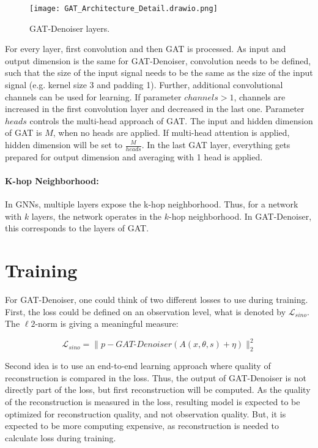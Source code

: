 \begin{figure}[H]
  \centering
  \texttt{[image: GAT\_Architecture\_Detail.drawio.png]}
  \caption{GAT-Denoiser layers.}
  \label{fig:architecture-detailed}
\end{figure}


For every layer, first convolution and then GAT is processed. 
As input and output dimension is the same for GAT-Denoiser,
convolution needs to be defined, such that the size of the input signal needs to be the same as the size of the input signal
(e.g. kernel size 3 and padding 1).
Further, additional convolutional channels can be used for learning.
If parameter $channels > 1$, channels are increased in the first convolution layer 
and decreased in the last one.
Parameter $heads$ controls the multi-head approach of GAT. The input and hidden dimension
of GAT is $M$, when no heads are applied.
If multi-head attention is applied, hidden dimension will be set to $\frac{M}{heads}$.
In the last GAT layer, everything gets prepared for output dimension and 
averaging with 1 head is applied.

\paragraph{K-hop Neighborhood:}
In GNNs, multiple layers expose the k-hop neighborhood. Thus, for a network with $k$ layers,
the network operates in the $k$-hop neighborhood. In GAT-Denoiser, this corresponds
to the layers of GAT.

\section{Training}

For GAT-Denoiser, one could think of two different losses to use during training.
First, the loss could be defined on an observation level, what is denoted by $\mathcal{L}_{sino}$. 
The $\ell2$-norm is giving a meaningful measure:

\begin{equation}
  \label{eq:loss_sino}
  \mathcal{L}_{sino} = \parallel p - \textit{GAT-Denoiser}(A(x, \theta, s) + \eta) \parallel ^2_2
\end{equation}

Second idea is to use an end-to-end learning approach where quality of reconstruction is 
compared in the loss. Thus, the output of GAT-Denoiser is not directly part of the loss, but first reconstruction will be computed.
As the quality of the reconstruction is measured in the loss, resulting model is expected to be optimized
for reconstruction quality, and not observation quality. But, it is expected to be more computing expensive,
as reconstruction is needed to calculate loss during training.

